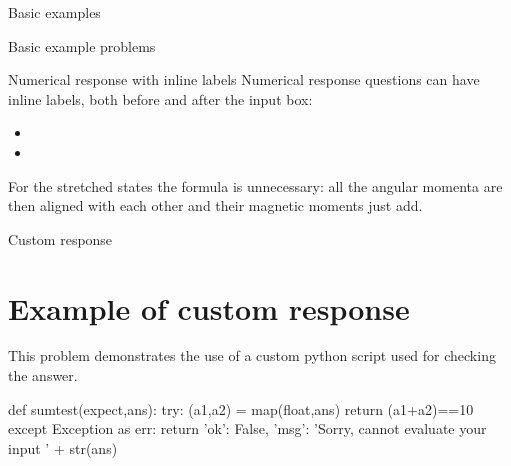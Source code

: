 \begin{edXchapter}{Basic examples}
\begin{edXsequential}{Basic example problems}
\begin{edXvertical}
\begin{edXproblem}{Numerical response with inline labels}{}
Numerical response questions can have inline labels, both before and after the input box:

\begin{itemize}

\item  

     

\item  

     

\end{itemize}

\begin{edXsolution}

For the stretched states the formula is unnecessary: all the angular momenta are
then aligned with each other and their magnetic moments just add. 

\end{edXsolution}

\end{edXproblem}

\end{edXvertical}


\begin{edXvertical}


\begin{edXproblem}{Custom response}

\section*{Example of custom response}  

This problem demonstrates the use of a custom python script used for
checking the answer.

\begin{edXscript}

def sumtest(expect,ans):
    try:
        (a1,a2) = map(float,ans)
        return (a1+a2)==10
    except Exception as err:
        return {'ok': False, 'msg': 'Sorry, cannot evaluate your input ' + str(ans)}

\end{edXscript}


\end{edXproblem}
\end{edXvertical}
\end{edXsequential}
\end{edXchapter}
